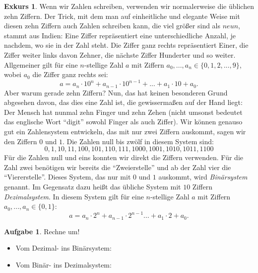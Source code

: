 \documentclass[a4paper,ngerman,12pt]{scrartcl}
\theoremstyle{definition}
\newtheorem*{aufg}{Aufgabe}
\newtheorem*{exk}{Exkurs}
\newenvironment{exkurs}{\begin{shaded}\begin{exk}}{\end{exk}\end{shaded}}
\begin{document}
\begin{exkurs}
  Wenn wir Zahlen schreiben, verwenden wir normalerweise die üblichen zehn Ziffern. Der Trick, mit dem man auf einheitliche und elegante Weise mit diesen zehn Ziffern auch Zahlen schreiben kann, die viel größer sind als $neun$, stammt aus Indien: Eine Ziffer repräsentiert eine unterschiedliche Anzahl, je nachdem, wo sie in der Zahl steht. Die Ziffer ganz rechts repräsentiert Einer, die Ziffer weiter links davon Zehner, die nächste Ziffer Hunderter und so weiter. Allgemeiner gilt für eine $n$-stellige Zahl $a$ mit Ziffern $a_0, ..., a_n \in \{ 0, 1, 2, ..., 9 \}$, wobei $a_0$ die Ziffer ganz rechts sei:
  \[ a = a_n \cdot 10^n + a_{n-1} \cdot 10^{n-1} + ... + a_1 \cdot 10 + a_0. \]
  Aber warum gerade zehn Ziffern? Nun, das hat keinen besonderen Grund abgesehen davon, das dies eine Zahl ist, die gewissermaßen auf der Hand liegt: Der Mensch hat nunmal zehn Finger und zehn Zehen (nicht umsonst bedeutet das englische Wort ``digit'' sowohl Finger als auch Ziffer). Wir können genauso gut ein Zahlensystem entwickeln, das mit nur zwei Ziffern auskommt, sagen wir den Ziffern $0$ und $1$. Die Zahlen null bis zwölf in diesem System sind:
  \[ 0, 1, 10, 11, 100, 101, 110, 111, 1000, 1001, 1010, 1011, 1100 \]
  Für die Zahlen null und eins konnten wir direkt die Ziffern verwenden. Für die Zahl zwei benötigen wir bereits die "`Zweierstelle"' und ab der Zahl vier die "`Viererstelle"'. Dieses System, das nur mit $0$ und $1$ auskommt, wird \emph{Binärsystem} genannt. Im Gegensatz dazu heißt das übliche System mit $10$ Ziffern \emph{Dezimalsystem}. In diesem System gilt für eine $n$-stellige Zahl $a$ mit Ziffern $a_0, ..., a_n \in \{ 0, 1 \}$:
  \[ a = a_n \cdot 2^n + a_{n-1} \cdot 2^{n-1} ... + a_1 \cdot 2 + a_0. \]
\end{exkurs}

\begin{aufg}
  Rechne um!
  \begin{itemize}
    \item Vom Dezimal- ins Binärsystem:
    \item Vom Binär- ins Dezimalsystem:
  \end{itemize}
\end{aufg}
\end{document}
